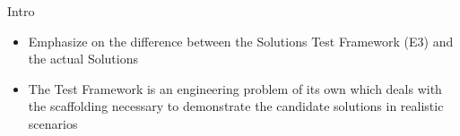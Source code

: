 \begin{frame}
\hypertarget{notes__000-intro.md}{}
\makeatletter
\def\fps@figure{h}
\makeatother

\begin{frame}{Intro}
\protect\hypertarget{notes__000-intro.md__intro}{}
\begin{itemize}
\item
  Emphasize on the difference between the Solutions Test Framework (E3)
  and the actual Solutions
\item
  The Test Framework is an engineering problem of its own which deals
  with the scaffolding necessary to demonstrate the candidate solutions
  in realistic scenarios
\end{itemize}
\end{frame}
\end{frame}

